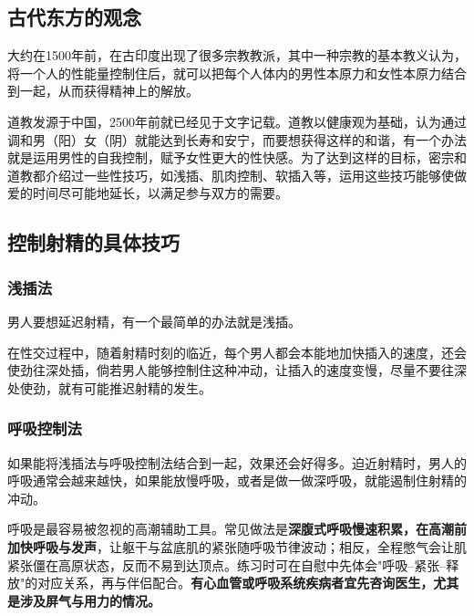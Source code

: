 \documentclass[12pt,UTF8]{ctexbook}
\begin{document}
\subsection{古代东方的观念}

大约在1500年前，在古印度出现了很多宗教教派，其中一种宗教的基本教义认为，将一个人的性能量控制住后，就可以把每个人体内的男性本原力和女性本原力结合到一起，从而获得精神上的解放。

道教发源于中国，2500年前就已经见于文字记载。道教以健康观为基础，认为通过调和男（阳）女（阴）就能达到长寿和安宁，而要想获得这样的和谐，有一个办法就是运用男性的自我控制，赋予女性更大的性快感。为了达到这样的目标，密宗和道教都介绍过一些性技巧，如浅插、肌肉控制、软插入等，运用这些技巧能够使做爱的时间尽可能地延长，以满足参与双方的需要。

\vspace{0.5em}
\subsection{控制射精的具体技巧}

\vspace{0.5em}
\subsubsection{浅插法}

男人要想延迟射精，有一个最简单的办法就是浅插。

在性交过程中，随着射精时刻的临近，每个男人都会本能地加快插入的速度，还会使劲往深处插，倘若男人能够控制住这种冲动，让插入的速度变慢，尽量不要往深处使劲，就有可能推迟射精的发生。

\vspace{0.5em}
\subsubsection{呼吸控制法}

如果能将浅插法与呼吸控制法结合到一起，效果还会好得多。迫近射精时，男人的呼吸通常会越来越快，如果能放慢呼吸，或者是做一做深呼吸，就能遏制住射精的冲动。

\vspace{0.5em}

呼吸是最容易被忽视的高潮辅助工具。常见做法是\textbf{深腹式呼吸慢速积累，在高潮前加快呼吸与发声}，让躯干与盆底肌的紧张随呼吸节律波动；相反，全程憋气会让肌紧张僵在高原状态，反而不易到达顶点。练习时可在自慰中先体会"呼吸--紧张--释放"的对应关系，再与伴侣配合。\textbf{有心血管或呼吸系统疾病者宜先咨询医生，尤其是涉及屏气与用力的情况。}
\end{document}
